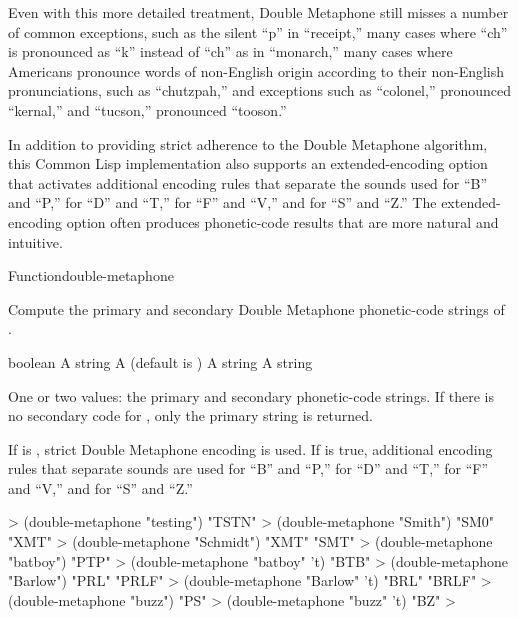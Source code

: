 \documentclass[10pt,twoside,english,pdftex]{article}
\begin{document}
Even with this more detailed treatment, Double Metaphone still misses a number
of common exceptions, such as the silent ``p'' in ``receipt,'' many cases
where ``ch'' is pronounced as ``k'' instead of ``ch'' as in ``monarch,'' many
cases where Americans pronounce words of non-English origin according to their
non-English pronunciations, such as ``chutzpah,'' and exceptions such as
``colonel,'' pronounced ``kernal,'' and ``tucson,'' pronounced ``tooson.''

In addition to providing strict adherence to the Double Metaphone algorithm,
this Common Lisp implementation also supports an extended-encoding option that
activates additional encoding rules that separate the sounds used for ``B''
and ``P,'' for ``D'' and ``T,'' for ``F'' and ``V,'' and for ``S'' and ``Z.''
The extended-encoding option often produces phonetic-code results that are
more natural and intuitive.

\W\entities
\T\clearpage


\begin{functiondoc}{Function}{double-metaphone}{
    }
%

\fnsyntax

\fnpurpose Compute the primary and secondary Double Metaphone phonetic-code
strings of .

\fnpackage {}

\fnmodule {}

\fnargs
\begin{args}{boolean}
\arg[string] A string
\arg[extended-p] A  (default is \nil)
 A string
 A string
\end{args}

\fnreturns One or two values: the primary and secondary phonetic-code strings.
If there is no secondary code for , only the primary string is
returned.

\fndescription
%
If  is \nil{}, strict Double Metaphone encoding is used.  If
 is true, additional encoding rules that separate sounds are
used for ``B'' and ``P,'' for ``D'' and ``T,'' for ``F'' and ``V,'' and for
``S'' and ``Z.''

\fnexamples
%
\W\supp
\begin{example}
  > (double-metaphone "testing")
  "TSTN"
  > (double-metaphone "Smith")
  "SM0"
  "XMT"
  > (double-metaphone "Schmidt")
  "XMT"
  "SMT"\goodpagebreak
  > (double-metaphone "batboy")
  "PTP"
  > (double-metaphone "batboy" 't)
  "BTB"\goodpagebreak
  > (double-metaphone "Barlow")
  "PRL"
  "PRLF"
  > (double-metaphone "Barlow" 't)
  "BRL" 
  "BRLF"\goodpagebreak
  > (double-metaphone "buzz")
  "PS"
  > (double-metaphone "buzz" 't)
  "BZ"
  >
\end{example}

\end{functiondoc}
\end{document}

